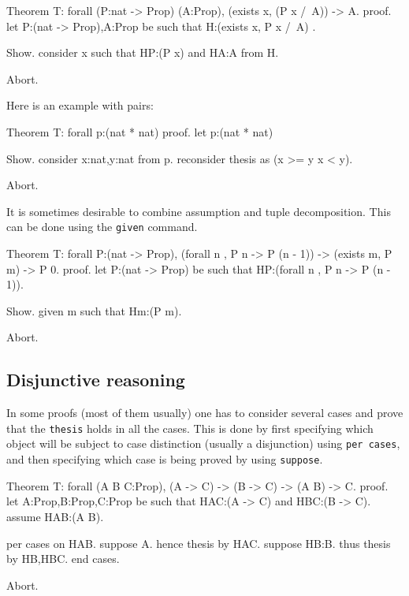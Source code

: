 \begin{coq_eval}
Theorem T: forall (P:nat -> Prop) (A:Prop), (exists x, (P x /\ A)) -> A.
proof.
let P:(nat -> Prop),A:Prop be such that H:(exists x, P x /\ A) .
\end{coq_eval} 
\begin{coq_example}
Show.
consider x such that HP:(P x) and HA:A from H.
\end{coq_example}
\begin{coq_eval}
Abort.
\end{coq_eval}

Here is an example with pairs:

\begin{coq_eval}
Theorem T: forall p:(nat * nat)%
proof.
let p:(nat * nat)%
\end{coq_eval} 
\begin{coq_example}
Show.
consider x:nat,y:nat from p.
reconsider thesis as (x >= y \/ x < y). 
\end{coq_example}
\begin{coq_eval}
Abort.
\end{coq_eval}

It is sometimes desirable to combine assumption and tuple
decomposition. This can be done using the {\tt given} command.

\begin{coq_eval}
Theorem T: forall P:(nat -> Prop), (forall n , P n -> P (n - 1)) -> 
(exists m, P m) -> P 0.
proof.
let P:(nat -> Prop) be such that HP:(forall n , P n -> P (n - 1)).
\end{coq_eval} 
\begin{coq_example}
Show.
given m such that Hm:(P m).  
\end{coq_example}
\begin{coq_eval}
Abort.
\end{coq_eval}
 
\subsection{Disjunctive reasoning}

In some proofs (most of them usually) one has to consider several
cases and prove that the {\tt thesis} holds in all the cases. This is
done by first specifying which object will be subject to case
distinction (usually a disjunction) using {\tt per cases}, and then specifying which case is being proved by using {\tt suppose}.


\begin{coq_eval}
Theorem T: forall (A B C:Prop), (A -> C) -> (B -> C) -> (A \/ B) -> C.
proof.
let A:Prop,B:Prop,C:Prop be such that HAC:(A -> C) and HBC:(B -> C).
assume HAB:(A \/ B).
\end{coq_eval} 
\begin{coq_example}
per cases on HAB.
suppose A.
  hence thesis by HAC.
suppose HB:B.
  thus thesis by HB,HBC.
end cases.
\end{coq_example}
\begin{coq_eval}
Abort.
\end{coq_eval}

